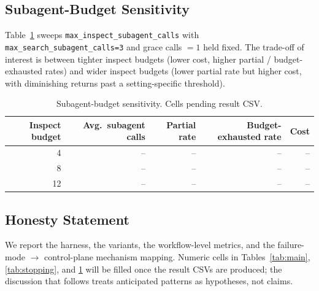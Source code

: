 \subsection{Subagent-Budget Sensitivity}

Table~\ref{tab:budget} sweeps \texttt{max\_inspect\_subagent\_calls} with \texttt{max\_search\_subagent\_calls=3} and grace calls $= 1$ held fixed. The trade-off of interest is between tighter inspect budgets (lower cost, higher partial / budget-exhausted rates) and wider inspect budgets (lower partial rate but higher cost, with diminishing returns past a setting-specific threshold).

\begin{table}[t]
\caption{Subagent-budget sensitivity. Cells pending result CSV.}
\label{tab:budget}
\centering
\begin{tabular}{rrrrr}
\toprule
Inspect budget & Avg.\ subagent calls & Partial rate & Budget-exhausted rate & Cost \\
\midrule
4   & -- & -- & -- & -- \\
8   & -- & -- & -- & -- \\
12  & -- & -- & -- & -- \\
\bottomrule
\end{tabular}
\end{table}

\subsection*{Honesty Statement}

We report the harness, the variants, the workflow-level metrics, and the failure-mode $\rightarrow$ control-plane mechanism mapping. Numeric cells in Tables~\ref{tab:main}, \ref{tab:stopping}, and \ref{tab:budget} will be filled once the result CSVs are produced; the discussion that follows treats anticipated patterns as hypotheses, not claims.
